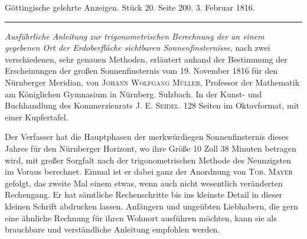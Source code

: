 \clearpage
{}
\hypertarget{native-596-lower}{}
\begin{center}\small Göttingische gelehrte Anzeigen. Stück 20. Seite 200. 3. Februar 1816.\\[3pt]\rule{.72\linewidth}{.3pt}\end{center}

\emph{Ausführliche Anleitung zur trigonometrischen Berechnung der an einem gegebenen Ort der Erdoberfläche sichtbaren Sonnenfinsternisse}, nach zwei verschiedenen, sehr genauen Methoden, erläutert anhand der Bestimmung der Erscheinungen der großen Sonnenfinsternis vom 19. November 1816 für den Nürnberger Meridian, von \textsc{Johann Wolfgang Müller}, Professor der Mathematik am Königlichen Gymnasium in Nürnberg. Sulzbach. In der Kunst- und Buchhandlung des Kommerzienrats J. E. \textsc{Seidel}. 128 Seiten im Oktavformat, mit einer Kupfertafel.

Der Verfasser hat die Hauptphasen der merkwürdiegen Sonnenfinsternis dieses Jahres für den Nürnberger Horizont, wo ihre Größe 10 Zoll 38 Minuten betragen wird, mit großer Sorgfalt nach der trigonometrischen Methode des Neunzigsten im Voraus berechnet. Einmal ist er dabei ganz der Anordnung von \textsc{Tob. Mayer} gefolgt, das zweite Mal einem etwas, wenn auch nicht wesentlich veränderten Rechengang. Er hat sämtliche Rechenschritte bis ins kleinste Detail in dieser kleinen Schrift abdrucken lassen. Anfängern und ungeübten Liebhabern, die gern eine ähnliche Rechnung für ihren Wohnort ausführen möchten, kann sie als brauchbare und verständliche Anleitung empfohlen werden.
